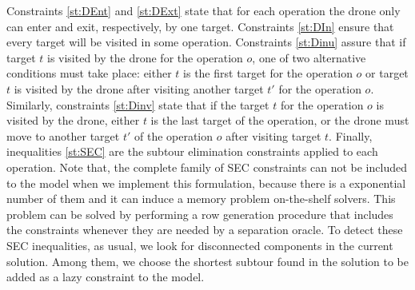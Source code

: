 Constraints \eqref{st:DEnt} and \eqref{st:DExt} state that for each operation the drone only can enter and exit, respectively, by one target.  Constraints \eqref{st:DIn} ensure that every target will be visited in some operation. Constraints \eqref{st:Dinu} assure that if target $t$ is visited by the drone for the operation $o$, one of two alternative conditions must take place: either $t$ is the first target for the operation $o$ or target $t$ is visited by the drone after visiting another target $t'$ for the operation $o$. Similarly, constraints \eqref{st:Dinv} state that if the target $t$ for the operation $o$ is visited by the drone, either $t$ is the last target of the operation, or the drone must move to another target $t'$ of the operation $o$ after visiting target $t$. Finally, inequalities \eqref{st:SEC} are the subtour elimination constraints applied to each operation. Note that, the complete family of SEC constraints can not be included to the model when we implement this formulation, because there is a exponential number of them and it can induce a memory problem on-the-shelf solvers. This problem can be solved by performing a row generation procedure that includes the constraints whenever they are needed by a separation oracle. To detect these SEC inequalities, as usual, we look for disconnected components in the current solution. Among them, we choose the shortest subtour found in the solution to be added as a lazy constraint to the model.\\



